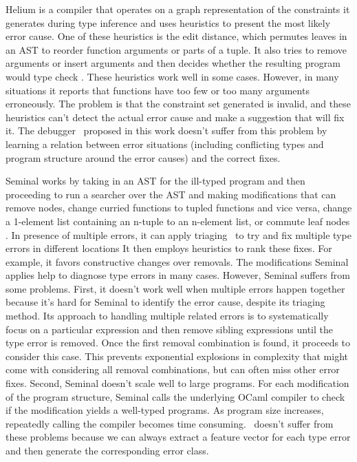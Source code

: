 \documentclass[12pt]{report}	%
\begin{document}
Helium \cite{Hage07:HTE} is a compiler that operates
on a graph representation of the constraints it generates
during type inference
and uses heuristics to present the most likely error cause. One
of these heuristics is the edit distance, which permutes leaves in
an AST to reorder function arguments or parts of a
tuple. It also tries to remove arguments or insert arguments and
then decides whether the resulting program would type check \cite{Heeren03:HLH}.
These heuristics work well in some cases. However, in many situations it
reports that functions have too few or too many arguments erroneously.
%
The problem is that the constraint
set generated is invalid, and these heuristics can't detect
the actual error cause and make a suggestion that will fix it.
%
The debugger \newCompiler\ proposed in this work doesn't suffer from this problem by learning
a relation between error situations (including conflicting types
and program structure around the error causes) and the correct fixes.


Seminal works by taking in an AST for the ill-typed program
and then proceeding to run a searcher over the AST and
making modifications that can remove nodes, change curried functions
to tupled functions and vice versa, change a 1-element list containing an n-tuple to an n-element list, or commute leaf nodes \cite{Lerner07:STM}.
In presence of multiple errors, it can apply triaging~\cite{Lerner07:STM}
to try and fix multiple type errors in different locations
It then employs heuristics to rank
these fixes. For example, it favors constructive changes over removals.
The modifications Seminal applies help to diagnose type
errors in many cases. However, Seminal suffers from
some problems. First, it doesn't work well when multiple errors
happen together because it's hard for Seminal to identify the error
cause, despite its triaging method.
%
Its approach to handling
multiple related errors is to systematically focus on a particular
expression and then remove sibling expressions until the type
error is removed. Once the first removal combination is found, it
proceeds to consider this case.
This prevents exponential explosions in complexity
that might come with considering all removal combinations,
but can often miss other error fixes.
%
Second, Seminal doesn't scale well to large programs.
For each modification of the program structure, Seminal calls
the underlying OCaml compiler to check if the modification yields
a well-typed programs. As program size increases, repeatedly calling
the compiler becomes time consuming.
%
\newCompiler\ doesn't suffer from these problems because
we can always extract a feature vector for each type error and
then generate the corresponding error class. 
\end{document}
